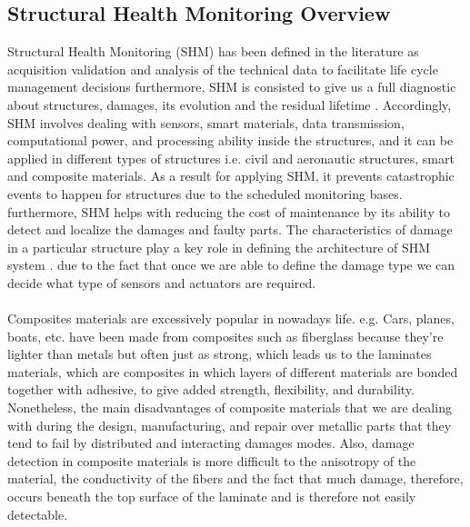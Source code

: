\documentclass[preprint,12pt]{elsarticle}
\begin{document}
	\subsection{Structural Health Monitoring Overview}
	Structural Health Monitoring (SHM) has been defined in the literature as  acquisition validation and analysis of the technical data to facilitate life cycle management decisions\cite{R.1999} furthermore, SHM is consisted to give us a full diagnostic about structures, damages, its evolution and the residual lifetime . Accordingly, SHM involves dealing with sensors, smart materials, data transmission, computational power, and processing ability inside the structures, and it can be applied in different types of structures i.e. civil and aeronautic structures, smart and composite materials. As a result for applying SHM, it prevents catastrophic events to happen for structures due to the scheduled monitoring bases. furthermore, SHM helps with reducing the cost of maintenance by its ability to detect and localize the damages and faulty parts. The characteristics of damage in a particular structure play a key role in defining the architecture of  SHM system . due to the fact that once we are able to define the damage type we can decide what type of sensors and actuators are required\cite{Kessler2002}. 
	\paragraph{}
	
	Composites materials are excessively popular in nowadays life. e.g. Cars, planes, boats, etc. have been made from composites such as fiberglass because they're lighter than metals but often just as strong, which leads us to the laminates materials, which are composites in which layers of different materials are bonded together with adhesive, to give added strength, flexibility, and durability. Nonetheless, the main disadvantages of composite materials that we are dealing with during the design, manufacturing, and repair over metallic parts that they tend to fail by distributed and interacting damages modes. Also, damage detection in composite materials is more difficult to the anisotropy of the material, the conductivity of the fibers and the fact that much damage, therefore, occurs beneath the top surface of the laminate and is therefore not easily detectable.
	\paragraph{}
	
\end{document}
